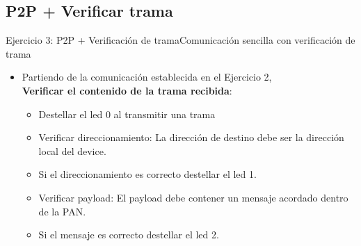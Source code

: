 \documentclass[aspectratio=169,handout]{beamer}
\begin{document}
\subsection[P2P+Verificar]{P2P + Verificar trama}
\begin{frame}[t]{Ejercicio 3: P2P + Verificación de trama}{Comunicación sencilla con verificación de trama}
    \begin{itemize}
        \item Partiendo de la comunicación establecida en el Ejercicio 2,\\ \textbf{Verificar el contenido de la trama recibida}:
        \vspace{10px}
            \begin{itemize}
            \item Destellar el led 0 al transmitir una trama
            \vspace{5px}
            \item Verificar direccionamiento: La dirección de destino debe ser la dirección local del device.
            \vspace{5px}
            \item Si el direccionamiento es correcto destellar el led 1.
			\vspace{5px}
            \item Verificar payload: El payload debe contener un mensaje acordado dentro de la PAN.
            \vspace{5px}
			\item Si el mensaje es correcto destellar el led 2. 
            \end{itemize}
        \vspace{5px}
    \end{itemize}   
\end{frame}


\end{document}
